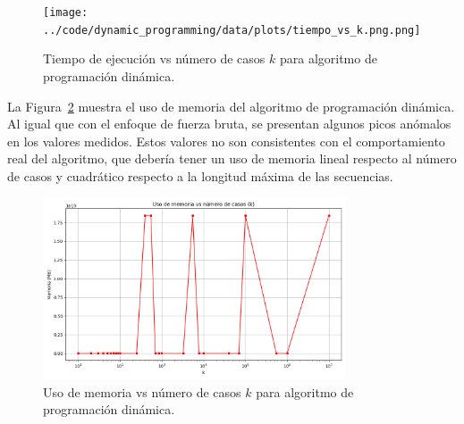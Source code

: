 \begin{figure}[H]
    \centering
    \texttt{[image: ../code/dynamic\_programming/data/plots/tiempo\_vs\_k.png.png]}
    \caption{Tiempo de ejecución vs número de casos $k$ para algoritmo de programación dinámica.}
    \label{fig:dp-tiempo}
\end{figure}

La Figura~\ref{fig:dp-memoria} muestra el uso de memoria del algoritmo de programación dinámica. Al igual que con el enfoque de fuerza bruta, se presentan algunos picos anómalos en los valores medidos. Estos valores no son consistentes con el comportamiento real del algoritmo, que debería tener un uso de memoria lineal respecto al número de casos y cuadrático respecto a la longitud máxima de las secuencias.

\begin{figure}[H]
    \centering
    \includegraphics[width=0.8\textwidth]{../code/dynamic_programming/data/plots/memoria_vs_k.png}
    \caption{Uso de memoria vs número de casos $k$ para algoritmo de programación dinámica.}
    \label{fig:dp-memoria}
\end{figure}